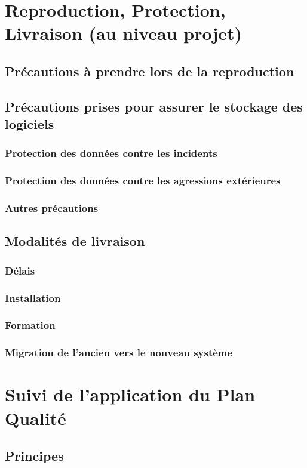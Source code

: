 \section{Reproduction, Protection, Livraison (au niveau projet)}
\subsection{Précautions à prendre lors de la reproduction}
\subsection{Précautions prises pour assurer le stockage des logiciels}
\subsubsection{Protection des données contre les incidents}
\subsubsection{Protection des données contre les agressions extérieures}
\subsubsection{Autres précautions}
\subsection{Modalités de livraison}
\subsubsection{Délais}
\subsubsection{Installation}
\subsubsection{Formation}
\subsubsection{Migration de l’ancien vers le nouveau système}

\section{Suivi de l’application du Plan Qualité}
\subsection{Principes}
